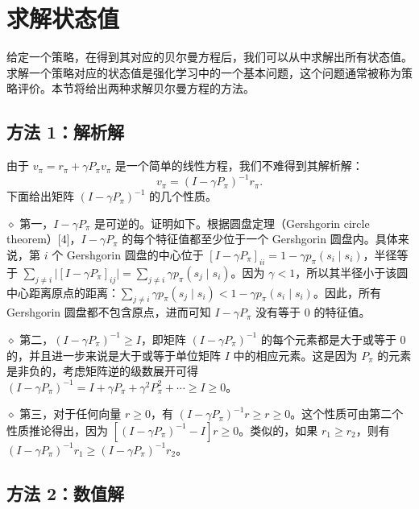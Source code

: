 \section{求解状态值}
\label{sec:rl-bellman-solve}

给定一个策略，在得到其对应的贝尔曼方程后，我们可以从中求解出所有状态值。求解一个策略对应的状态值是强化学习中的一个基本问题，这个问题通常被称为策略评价。本节将给出两种求解贝尔曼方程的方法。

\subsection{方法 1：解析解}
\label{sec:rl-bellman-analytic}

由于 $v_\pi = r_\pi + \gamma P_\pi v_\pi$ 是一个简单的线性方程，我们不难得到其解析解：
\begin{equation}
v_\pi = (I - \gamma P_\pi)^{-1} r_\pi.
\label{eq:rl-bellman-closed-form}
\end{equation}
下面给出矩阵 $(I - \gamma P_\pi)^{-1}$ 的几个性质。

\medskip
$\diamond$ 第一，$I - \gamma P_\pi$ 是可逆的。证明如下。根据圆盘定理（Gershgorin circle theorem）[4]，$I - \gamma P_\pi$ 的每个特征值都至少位于一个 Gershgorin 圆盘内。具体来说，第 $i$ 个 Gershgorin 圆盘的中心位于 $[I - \gamma P_\pi]_{ii} = 1 - \gamma p_\pi(s_i \mid s_i)$，半径等于 $\sum_{j \neq i} \bigl| [I - \gamma P_\pi]_{ij} \bigr| = \sum_{j \neq i} \gamma p_\pi(s_j \mid s_i)$。因为 $\gamma < 1$，所以其半径小于该圆中心距离原点的距离：$\sum_{j \neq i} \gamma p_\pi(s_j \mid s_i) < 1 - \gamma p_\pi(s_i \mid s_i)$。因此，所有 Gershgorin 圆盘都不包含原点，进而可知 $I - \gamma P_\pi$ 没有等于 $0$ 的特征值。

\medskip
$\diamond$ 第二，$(I - \gamma P_\pi)^{-1} \geqslant I$，即矩阵 $(I - \gamma P_\pi)^{-1}$ 的每个元素都是大于或等于 $0$ 的，并且进一步来说是大于或等于单位矩阵 $I$ 中的相应元素。这是因为 $P_\pi$ 的元素是非负的，考虑矩阵逆的级数展开可得 $(I - \gamma P_\pi)^{-1} = I + \gamma P_\pi + \gamma^2 P_\pi^2 + \cdots \geqslant I \geqslant 0$。

\medskip
$\diamond$ 第三，对于任何向量 $r \geqslant 0$，有 $(I - \gamma P_\pi)^{-1} r \geqslant r \geqslant 0$。这个性质可由第二个性质推论得出，因为 $[(I - \gamma P_\pi)^{-1} - I] r \geqslant 0$。类似的，如果 $r_1 \geqslant r_2$，则有 $(I - \gamma P_\pi)^{-1} r_1 \geqslant (I - \gamma P_\pi)^{-1} r_2$。

\subsection{方法 2：数值解}
\label{sec:rl-bellman-numerical}

